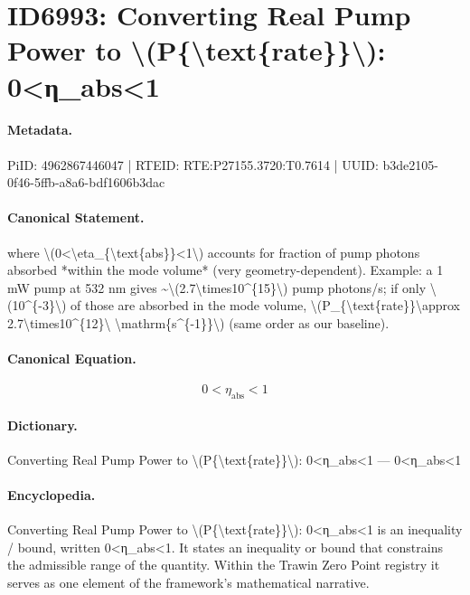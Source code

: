 \section*{ID6993: Converting Real Pump Power to \textbackslash{}(P\{\textbackslash{}text\{rate\}\}\textbackslash{}): 0<η\_abs<1}
\paragraph{Metadata.}
PiID: 4962867446047 | RTEID: RTE:P27155.3720:T0.7614 | UUID: b3de2105-0f46-5ffb-a8a6-bdf1606b3dac

\paragraph{Canonical Statement.}
where \textbackslash{}(0<\textbackslash{}eta\_\{\textbackslash{}text\{abs\}\}<1\textbackslash{}) accounts for fraction of pump photons absorbed *within the mode volume* (very geometry-dependent). Example: a 1 mW pump at 532 nm gives \textasciitilde{}\textbackslash{}(2.7\textbackslash{}times10\textasciicircum{}\{15\}\textbackslash{}) pump photons/s; if only \textbackslash{}(10\textasciicircum{}\{-3\}\textbackslash{}) of those are absorbed in the mode volume, \textbackslash{}(P\_\{\textbackslash{}text\{rate\}\}\textbackslash{}approx 2.7\textbackslash{}times10\textasciicircum{}\{12\}\textbackslash{} \textbackslash{}mathrm\{s\textasciicircum{}\{-1\}\}\textbackslash{}) (same order as our baseline).

\paragraph{Canonical Equation.}
\[
0<\eta_{\text{abs}}<1
\]

\paragraph{Dictionary.}
Converting Real Pump Power to \textbackslash{}(P\{\textbackslash{}text\{rate\}\}\textbackslash{}): 0<η\_abs<1 — 0<η\_abs<1

\paragraph{Encyclopedia.}
Converting Real Pump Power to \textbackslash{}(P\{\textbackslash{}text\{rate\}\}\textbackslash{}): 0<η\_abs<1 is an inequality / bound, written 0<η\_abs<1. It states an inequality or bound that constrains the admissible range of the quantity. Within the Trawin Zero Point registry it serves as one element of the framework's mathematical narrative.
